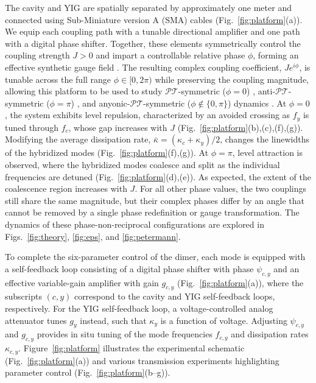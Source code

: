 \documentclass[%
  reprint,
  amsmath,amssymb,
  aps,
  prapplied,
  superscriptaddress,
  longbibliography]{revtex4-2}
\begin{document}
The cavity and YIG are spatially separated by approximately one meter and connected using Sub-Miniature version A (SMA) cables \cite{rao_meterscale_2023} (Fig.~\ref{fig:platform}(a)). We equip each coupling path with a tunable directional amplifier and one path with a digital phase shifter. Together, these elements symmetrically control the coupling strength $J>0$ and impart a controllable relative phase $\phi$, forming an effective synthetic gauge field \cite{salcedo-gallo_demonstration_2025, gardin_engineering_2024}. The resulting complex coupling coefficient, $Je^{i\phi}$, is tunable across the full range $\phi \in [0, 2\pi)$ while preserving the coupling magnitude, allowing this platform to be used to study $\mathcal{PT}$-symmetric ($\phi = 0$) \cite{bender_real_1998, regensburger_paritytime_2012}, anti-$\mathcal{PT}$-symmetric ($\phi = \pi$) \cite{peng_anti-paritytime_2016, li_antiparity-time_2019, choi_observation_2018, zhang_synthetic_2020}, and anyonic-$\mathcal{PT}$-symmetric ($\phi \notin \{0, \pi\}$) dynamics \cite{li_experimental_2024, arwas_anyonic-parity-time_2022, gao_parity-time-anyonic_2019}. At $\phi = 0$, the system exhibits level repulsion, characterized by an avoided crossing as $f_y$ is tuned through $f_c$, whose gap increases with $J$ \cite{harder_level_2018} (Fig.~\ref{fig:platform}(b),(c),(f),(g)). Modifying the average dissipation rate, $\bar{\kappa} = (\kappa_c + \kappa_y)/2$, changes the linewidths of the hybridized modes (Fig.~\ref{fig:platform}(f),(g)). At $\phi = \pi$, level attraction is observed, where the hybridized modes coalesce and split as the individual frequencies are detuned (Fig.~\ref{fig:platform}(d),(e)). As expected, the extent of the coalescence region increases with $J$. For all other phase values, the two couplings still share the same magnitude, but their complex phases differ by an angle that cannot be removed by a single phase redefinition or gauge transformation. The dynamics of these phase-non-reciprocal configurations are explored in Figs.~\ref{fig:theory}, \ref{fig:eps}, and \ref{fig:petermann}.

To complete the six-parameter control of the dimer, each mode is equipped with a self-feedback loop consisting of a digital phase shifter with phase $\psi_{c,y}$ and an effective variable-gain amplifier with gain $g_{c,y}$ (Fig.~\ref{fig:platform}(a)), where the subscripts $(c, y)$ correspond to the cavity and YIG self-feedback loops, respectively. For the YIG self-feedback loop, a voltage-controlled analog attenuator tunes $g_y$ instead, such that $\kappa_y$ is a function of voltage. Adjusting $\psi_{c,y}$ and $g_{c,y}$ provides in situ tuning of the mode frequencies $f_{c,y}$ and dissipation rates $\kappa_{c,y}$. Figure~\ref{fig:platform} illustrates the experimental schematic (Fig.~\ref{fig:platform}(a)) and various transmission experiments highlighting parameter control (Fig.~\ref{fig:platform}(b--g)).
\end{document}

